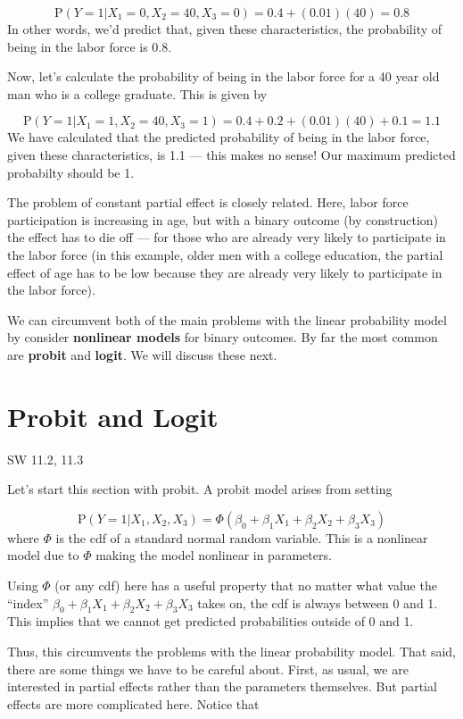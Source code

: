 \documentclass[
  letterpaper,
  DIV=11,
  numbers=noendperiod]{scrreprt}
\begin{document}
\[
  \mathrm{P}(Y=1 | X_1=0, X_2=40, X_3=0) = 0.4 + (0.01)(40) = 0.8
\] In other words, we'd predict that, given these characteristics, the
probability of being in the labor force is 0.8.

Now, let's calculate the probability of being in the labor force for a
40 year old man who is a college graduate. This is given by

\[
  \mathrm{P}(Y=1|X_1=1, X_2=40, X_3=1) = 0.4 + 0.2 + (0.01)(40) + 0.1 = 1.1
\] We have calculated that the predicted probability of being in the
labor force, given these characteristics, is 1.1 --- this makes no
sense! Our maximum predicted probabilty should be 1.

The problem of constant partial effect is closely related. Here, labor
force participation is increasing in age, but with a binary outcome (by
construction) the effect has to die off --- for those who are already
very likely to participate in the labor force (in this example, older
men with a college education, the partial effect of age has to be low
because they are already very likely to participate in the labor force).

We can circumvent both of the main problems with the linear probability
model by consider \textbf{nonlinear models} for binary outcomes. By far
the most common are \textbf{probit} and \textbf{logit}. We will discuss
these next.

\section{Probit and Logit}\label{probit-and-logit}

SW 11.2, 11.3

Let's start this section with probit. A probit model arises from setting

\[
  \mathrm{P}(Y=1|X_1,X_2,X_3) = \Phi(\beta_0 + \beta_1 X_1 + \beta_2 X_2 + \beta_3 X_3)
\] where \(\Phi\) is the cdf of a standard normal random variable. This
is a nonlinear model due to \(\Phi\) making the model nonlinear in
parameters.

Using \(\Phi\) (or any cdf) here has a useful property that no matter
what value the ``index''
\(\beta_0 + \beta_1 X_1 + \beta_2 X_2 + \beta_3 X_3\) takes on, the cdf
is always between 0 and 1. This implies that we cannot get predicted
probabilities outside of 0 and 1.

Thus, this circumvents the problems with the linear probability model.
That said, there are some things we have to be careful about. First, as
usual, we are interested in partial effects rather than the parameters
themselves. But partial effects are more complicated here. Notice that
\end{document}
